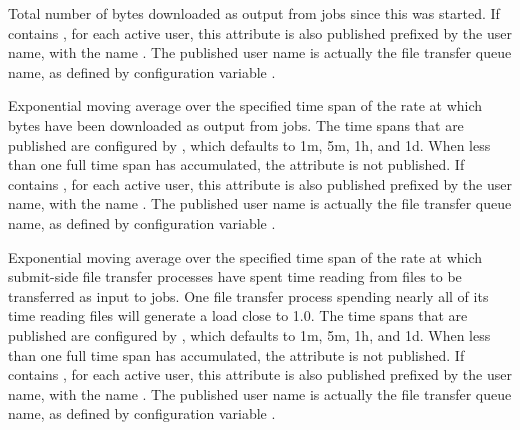 \begin{description}

\item[\AdAttr{FileTransferDownloadBytes}] Total number of bytes
  downloaded as output from jobs since this  was
  started.
  If  contains ,
  for each active user, this attribute is also published prefixed by
  the user name, with the name .
  The published user name is actually the file transfer queue name, as
  defined by configuration variable .

\item[\AdAttr{FileTransferDownloadBytesPerSecond\_<timespan>}]
  Exponential moving average over the specified time span of the rate
  at which bytes have been downloaded as output from jobs.
  The time spans that are published are configured by
  , which defaults to
  1m, 5m, 1h, and 1d.  When less than one full time span has
  accumulated, the attribute is not published.
  If  contains ,
  for each active user, this attribute is also published prefixed by
  the user name, with the name 
  .
  The published user name is actually the file transfer queue name, as
  defined by configuration variable .

\item[\AdAttr{FileTransferFileReadLoad\_<timespan>}] Exponential
  moving average over the specified time span of the rate at which
  submit-side file transfer processes have spent time reading from
  files to be transferred as input to jobs.  One file transfer process
  spending nearly all of its time reading files will generate a load
  close to 1.0.
  The time spans that are published are configured by
  , which defaults to
  1m, 5m, 1h, and 1d.  When less than one full time span has
  accumulated, the attribute is not published.
  If  contains ,
  for each active user, this attribute is also published prefixed by
  the user name, with the name
  .
  The published user name is actually the file transfer queue name, as
  defined by configuration variable .


\end{description}

